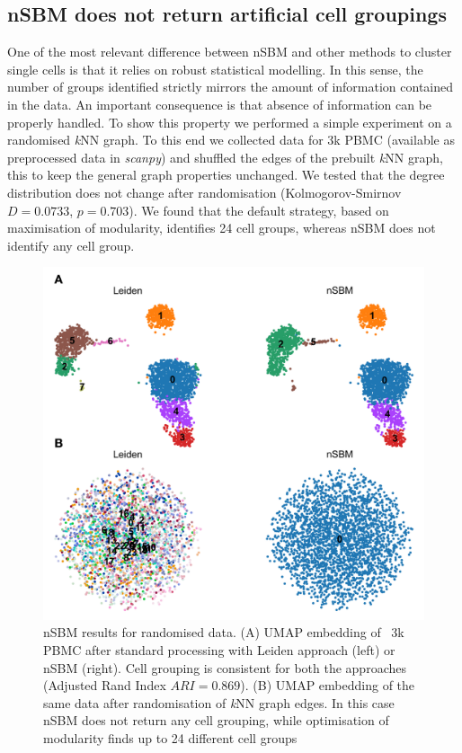 \documentclass[10pt]{article}
\begin{document}
\subsection*{nSBM does not return artificial cell groupings}

One of the most relevant difference between nSBM and other methods to cluster single cells is that it relies on robust statistical modelling. In this sense, the number of groups identified strictly mirrors the amount of information contained in the data. An important consequence is that absence of information can be properly handled. To show this property we performed a simple experiment on a randomised \emph{k}NN graph. To this end we collected data for 3k PBMC (available as preprocessed data in \emph{scanpy}) and shuffled the edges of the prebuilt \emph{k}NN graph, this to keep the general graph properties unchanged. We tested that the degree distribution does not change after randomisation (Kolmogorov-Smirnov $D=0.0733$, $p=0.703$). We found that the default strategy, based on maximisation of modularity, identifies 24 cell groups, whereas nSBM does not identify any cell group. 

\begin{figure}[H]
\centering
\includegraphics[keepaspectratio,width=\textwidth,height=0.4\textheight]{FIgure_Random.png}
\caption[]{nSBM results for randomised data. (A) UMAP embedding of ~3k PBMC after standard processing with Leiden approach (left) or nSBM (right). Cell grouping is consistent for both the approaches (Adjusted Rand Index $ARI=0.869$). (B) UMAP embedding of the same data after randomisation of \emph{k}NN graph edges. In this case nSBM does not return any cell grouping, while optimisation of modularity finds up to 24 different cell groups}\label{FigureRandom}
\end{figure}
\end{document}

